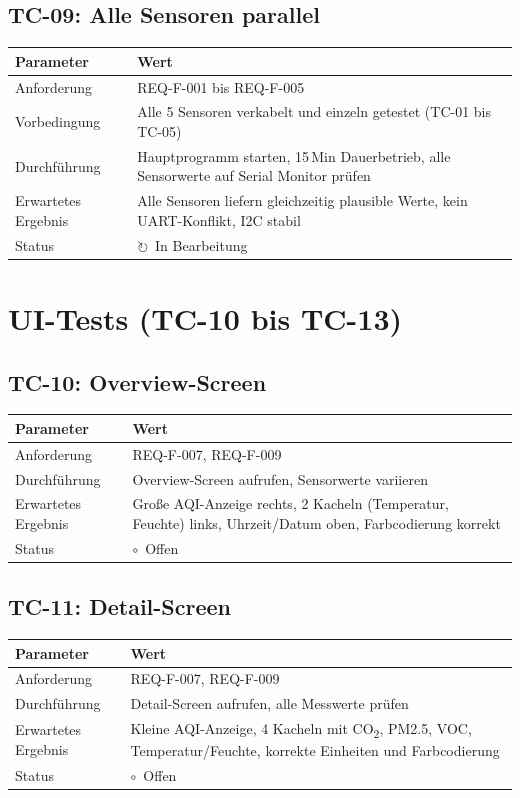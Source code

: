 \documentclass[a4paper,11pt]{article}
\begin{document}
\subsection{TC-09: Alle Sensoren parallel}
\begin{tabularx}{\textwidth}{lX}
\toprule
\rowcolor{tableheader}
\textbf{Parameter} & \textbf{Wert} \\
\midrule
Anforderung & REQ-F-001 bis REQ-F-005 \\
Vorbedingung & Alle 5 Sensoren verkabelt und einzeln getestet (TC-01 bis TC-05) \\
Durchführung & Hauptprogramm starten, 15\,Min Dauerbetrieb, alle Sensorwerte auf Serial Monitor prüfen \\
Erwartetes Ergebnis & Alle Sensoren liefern gleichzeitig plausible Werte, kein UART-Konflikt, I2C stabil \\
Status & $\circlearrowright$~In Bearbeitung \\
\bottomrule
\end{tabularx}

\section{UI-Tests (TC-10 bis TC-13)}

\subsection{TC-10: Overview-Screen}
\begin{tabularx}{\textwidth}{lX}
\toprule
\rowcolor{tableheader}
\textbf{Parameter} & \textbf{Wert} \\
\midrule
Anforderung & REQ-F-007, REQ-F-009 \\
Durchführung & Overview-Screen aufrufen, Sensorwerte variieren \\
Erwartetes Ergebnis & Große AQI-Anzeige rechts, 2 Kacheln (Temperatur, Feuchte) links, Uhrzeit/Datum oben, Farbcodierung korrekt \\
Status & $\circ$~Offen \\
\bottomrule
\end{tabularx}

\subsection{TC-11: Detail-Screen}
\begin{tabularx}{\textwidth}{lX}
\toprule
\rowcolor{tableheader}
\textbf{Parameter} & \textbf{Wert} \\
\midrule
Anforderung & REQ-F-007, REQ-F-009 \\
Durchführung & Detail-Screen aufrufen, alle Messwerte prüfen \\
Erwartetes Ergebnis & Kleine AQI-Anzeige, 4 Kacheln mit CO\textsubscript{2}, PM2.5, VOC, Temperatur/Feuchte, korrekte Einheiten und Farbcodierung \\
Status & $\circ$~Offen \\
\bottomrule
\end{tabularx}
\end{document}
